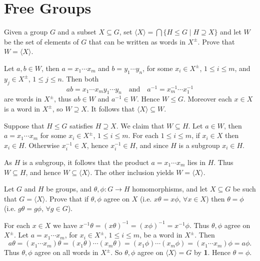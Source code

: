 \section{Free Groups}

\begin{questions}
\question Given a group $G$ and a subset $X\subseteq G$, set $\langle X \rangle = \bigcap\{H\leq G \mid H\supseteq X\}$ and let $W$ be the set of elements of $G$ that can be written as words in $X^{\pm}$. Prove that $W=\langle X \rangle$.
  \begin{solution}
    Let $a,b\in W$, then $a=x_1\cdots x_m$ and $b=y_1\cdots y_n$, for some $x_i\in X^\pm$, $1\leq i\leq m$, and $y_j\in X^\pm$, $1\leq j\leq n$. Then both
    \[ ab=x_1\cdots x_my_1\cdots y_n \quad \text{and} \quad a^{-1}=x_m^{-1}\cdots x_1^{-1} \]
    are words in $X^\pm$, thus $ab\in W$ and $a^{-1}\in W$. Hence $W\leq G$. Moreover each $x\in X$ is a word in $X^\pm$, so $W\supseteq X$. It follows that $\langle X \rangle\subseteq W$.

    Suppose that $H\leq G$ satisfies $H\supseteq X$. We claim that $W\subseteq H$. Let $a\in W$, then $a=x_1\cdots x_m$ for some $x_i\in X^\pm$, $1\leq i\leq m$. For each $1\leq i\leq m$, if $x_i\in X$ then $x_i\in H$. Otherwise $x_i^{-1}\in X$, hence $x_i^{-1}\in H$, and since $H$ is a subgroup $x_i\in H$.

    As $H$ is a subgroup, it follows that the product $a=x_1\cdots x_m$ lies in $H$. Thus $W\subseteq H$, and hence $W\subseteq\langle X \rangle$. The other inclusion yields $W=\langle X \rangle$.
  \end{solution}

\question Let $G$ and $H$ be groups, and $\theta,\phi\colon G\to H$ homomorphisms, and let $X\subseteq G$ be such that $G=\langle X \rangle$. Prove that if $\theta,\phi$ agree on $X$ (i.e. $x\theta=x\phi$, $\forall x\in X$) then $\theta=\phi$ (i.e. $g\theta=g\phi$, $\forall g\in G$).
  \begin{solution}
    For each $x\in X$ we have $x^{-1}\theta = (x\theta)^{-1} = (x\phi)^{-1} = x^{-1}\phi$. Thus $\theta,\phi$ agree on $X^\pm$. Let $a=x_1\cdots x_m$, for $x_i\in X^\pm$, $1\leq i\leq m$, be a word in $X^\pm$. Then
    \[ a\theta = (x_1\cdots x_m)\theta = (x_1\theta)\cdots(x_m\theta) = (x_1\phi)\cdots(x_m\phi) = (x_1\cdots x_m)\phi = a\phi. \]
    Thus $\theta,\phi$ agree on all words in $X^\pm$. So $\theta,\phi$ agree on $\langle X \rangle=G$ by \textbf{1}. Hence $\theta=\phi$.
  \end{solution}


\end{questions}
